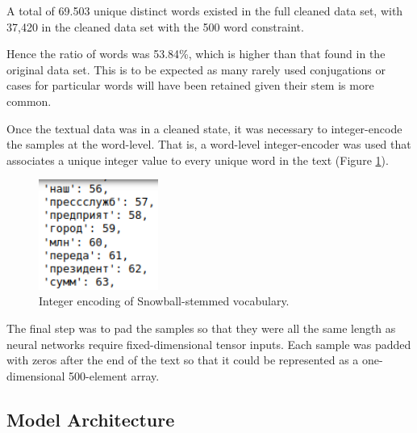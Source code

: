 \documentclass[12pt]{article}
\begin{document}
A total of 69.503 unique distinct words existed in the full cleaned data set, with 37,420 in the cleaned data set with the 500 word constraint.

Hence the ratio of words was 53.84\%, which is higher than that found in the original data set. This is to be expected as many rarely used conjugations or cases for particular words will have been retained given their stem is more common.

Once the textual data was in a cleaned state, it was necessary to integer-encode the samples at the word-level. That is, a word-level integer-encoder was used that associates a unique integer value to every unique word in the text (Figure \ref{integer_encoding}).

\begin{figure}[ht]
\centering     %
\includegraphics[width=0.35\textwidth]{integer_encoding}
\caption{Integer encoding of Snowball-stemmed vocabulary.}
\label{integer_encoding}
\end{figure}

The final step was to pad the samples so that they were all the same length as neural networks require fixed-dimensional tensor inputs. Each sample was padded with zeros after the end of the text so that it could be represented as a one-dimensional 500-element array.

\subsection{Model Architecture}




\end{document}
